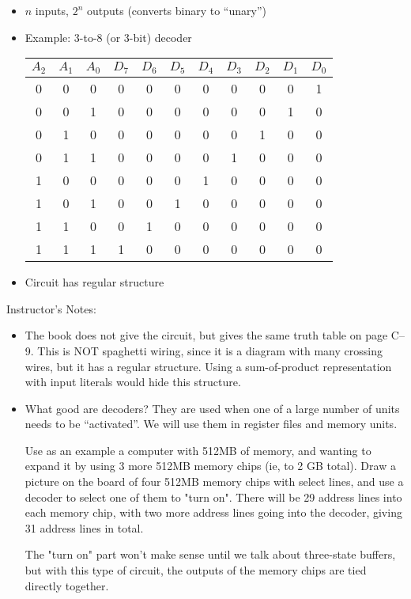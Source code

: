 
\begin{frame}[fragile]
\begin{itemize}
	\item $n$ inputs, $2^n$ outputs (converts binary to ``unary'')
	\item Example: 3-to-8 (or 3-bit) decoder
		\begin{center}
		\begin{tabular}{ccc|cccccccc}
		$A_2$ & $A_1$ & $A_0$ & $D_7$ & $D_6$ & $D_5$ & $D_4$ & $D_3$ & $D_2$ & $D_1$ & $D_0$\\\hline
		0 & 0 & 0 & 0 & 0 & 0 & 0 & 0 & 0 & 0 &1\\
		0 & 0 & 1 & 0 & 0 & 0 & 0 & 0 & 0 & 1 &0\\
		0 & 1 & 0 & 0 & 0 & 0 & 0 & 0 & 1 & 0 &0\\
		0 & 1 & 1 & 0 & 0 & 0 & 0 & 1 & 0 & 0 &0\\
		1 & 0 & 0 & 0 & 0 & 0 & 1 & 0 & 0 & 0 &0\\
		1 & 0 & 1 & 0 & 0 & 1 & 0 & 0 & 0 & 0 &0\\
		1 & 1 & 0 & 0 & 1 & 0 & 0 & 0 & 0 & 0 &0\\
		1 & 1 & 1 & 1 & 0 & 0 & 0 & 0 & 0 & 0 &0\\
		\end{tabular}
		\end{center}
	\item Circuit has regular structure
\end{itemize}
\end{frame}
\BNotes\ifnum{}
\begin{frame}[fragile]
Instructor's Notes:
\begin{itemize}
\item
	The book does not give the circuit, but gives the same truth table on
	page C--9. This is NOT spaghetti wiring, since it is a
	diagram with many crossing wires, but it has a regular
	structure. Using a sum-of-product representation with input literals
	would hide this structure.
\item 
	What good are decoders? They are used when one of a large number of
	units needs to be ``activated''. We will use them in register files
	and memory units.

	Use as an example a computer with 512MB of memory, and wanting
	to expand it by using 3 more 512MB memory chips (ie, to 2 GB total).
	Draw a picture on the board of four 512MB memory chips with select 
	lines, and use a decoder to select one of them to "turn on".  There
	will be 29 address lines into each memory chip, with two more 
	address lines going into the decoder, giving 31 address lines in
	total.

	The "turn on" part won't make sense until we talk about three-state
	buffers, but with this type of circuit, the outputs of the memory
	chips are tied directly together.
\end{itemize}
\end{frame}
\fi\ENotes

